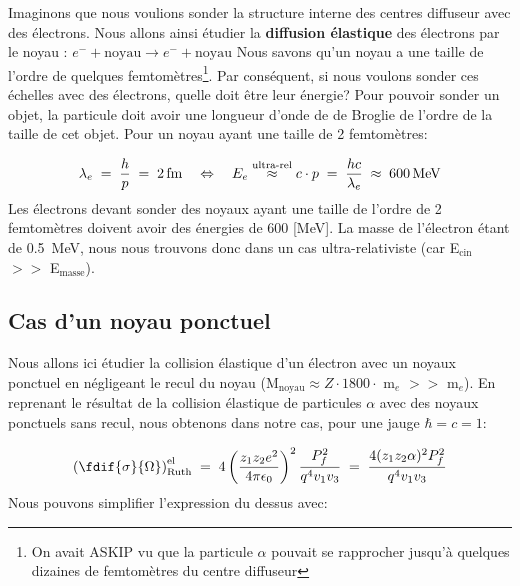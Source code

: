 Imaginons que nous voulions sonder la structure interne des centres diffuseur avec des électrons. Nous allons ainsi étudier la \textbf{diffusion élastique} des électrons par le noyau : $e^- + \text{noyau} \rightarrow e^- + \text{noyau}$
Nous savons qu'un noyau a une taille de l'ordre de quelques femtomètres\footnote{On avait ASKIP vu que la particule $\alpha$ pouvait se rapprocher jusqu'à quelques dizaines de femtomètres du centre diffuseur}. Par conséquent, si nous voulons sonder ces échelles avec des électrons, quelle doit être leur énergie? Pour pouvoir sonder un objet, la particule doit avoir une longueur d'onde de de Broglie de l'ordre de la taille de cet objet. Pour un noyau ayant une taille de 2 femtomètres:

\begin{equation}
    \lambda_e \; = \; \dfrac{h}{p} \; = \; \SI{2}{fm}
    \quad \Leftrightarrow \quad
    E_e \stackrel{\text{ultra-rel}}{\approx}c\cdot p \; = \; \dfrac{hc}{\lambda_e} 
    \; \approx \;
    \SI{600}{MeV}
\end{equation}
Les électrons devant sonder des noyaux ayant une taille de l'ordre de 2 femtomètres doivent avoir des énergies de 600 [{MeV}]. La masse de l'électron étant de \SI{0.5}{MeV}, nous nous trouvons donc dans un cas ultra-relativiste (car E$_\text{cin}$ $>>$ E$_\text{masse}$).


\subsection{Cas d'un noyau ponctuel}


Nous allons ici étudier la collision élastique d'un électron avec un noyaux ponctuel en négligeant le recul du noyau (M$_\text{noyau}\approx Z \cdot 1800 \cdot$ m$_e$ $>>$ m$_e$). En reprenant le résultat de la collision élastique de particules $\alpha$ avec des noyaux ponctuels sans recul, nous obtenons dans notre cas, pour une jauge $\hbar=c=1$:

\[
    \left(  \fdif{\sigma}{\Omega} \right)_\text{Ruth}^\text{el}
    \eq
    4 \left( \dfrac{z_1 z_2e^2}{4\pi\epsilon_0} \right)^2 \dfrac{P_f^2}{q^4v_1v_3}
    \eq
    \dfrac{4 (z_1 z_2 \alpha)^2 P_f^2}{q^4v_1v_3}
\]
Nous pouvons simplifier l'expression du dessus avec:

